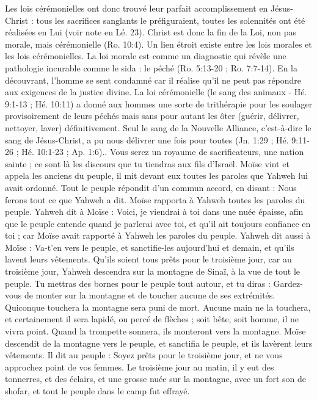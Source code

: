 \begin{multicols}{2}
{Les lois cérémonielles ont donc trouvé leur parfait accomplissement en Jésus-Christ : tous les sacrifices sanglants le préfiguraient, toutes les solennités ont été réalisées en Lui (voir note en Lé. 23). Christ est donc la fin de la Loi, non pas morale, mais cérémonielle (Ro. 10:4).
Un lien étroit existe entre les lois morales et les lois cérémonielles. La loi morale est comme un diagnostic qui révèle une pathologie incurable comme le sida : le péché (Ro. 5:13-20 ; Ro. 7:7-14). En la découvrant, l’homme se sent condamné car il réalise qu’il ne peut pas répondre aux exigences de la justice divine. La loi cérémonielle (le sang des animaux - Hé. 9:1-13 ; Hé. 10:11) a donné aux hommes une sorte de trithérapie pour les soulager provisoirement de leurs péchés mais sans pour autant les ôter (guérir, délivrer, nettoyer, laver) définitivement. Seul le sang de la Nouvelle Alliance, c’est-à-dire le sang de Jésus-Christ, a pu nous délivrer une fois pour toutes (Jn. 1:29 ; Hé. 9:11-26 ; Hé. 10:1-23 ; Ap. 1:6).}.
Vous serez un royaume de sacrificateurs, une nation sainte ; ce sont là les discours que tu tiendras aux fils d'Israël.
Moïse vint et appela les anciens du peuple, il mit devant eux toutes les paroles que Yahweh lui avait ordonné.
Tout le peuple répondit d'un commun accord, en disant : Nous ferons tout ce que Yahweh a dit. Moïse rapporta à Yahweh toutes les paroles du peuple.
Yahweh dit à Moïse : Voici, je viendrai à toi dans une nuée épaisse, afin que le peuple entende quand je parlerai avec toi, et qu'il ait toujours confiance en toi ; car Moïse avait rapporté à Yahweh les paroles du peuple.
Yahweh dit aussi à Moïse : Va-t'en vers le peuple, et sanctifie-les aujourd'hui et demain, et qu'ils lavent leurs vêtements.
Qu'ils soient tous prêts pour le troisième jour, car au troisième jour, Yahweh descendra sur la montagne de Sinaï, à la vue de tout le peuple.
Tu mettras des bornes pour le peuple tout autour, et tu diras : Gardez-vous de monter sur la montagne et de toucher aucune de ses extrémités. Quiconque touchera la montagne sera puni de mort.
Aucune main ne la touchera, et certainement il sera lapidé, ou percé de flèches ; soit bête, soit homme, il ne vivra point. Quand la trompette sonnera, ils monteront vers la montagne.
Moïse descendit de la montagne vers le peuple, et sanctifia le peuple, et ils lavèrent leurs vêtements.
Il dit au peuple : Soyez prêts pour le troisième jour, et ne vous approchez point de vos femmes.
Le troisième jour au matin, il y eut des tonnerres, et des éclairs, et une grosse nuée sur la montagne, avec un fort son de shofar, et tout le peuple dans le camp fut effrayé.

\end{multicols}
